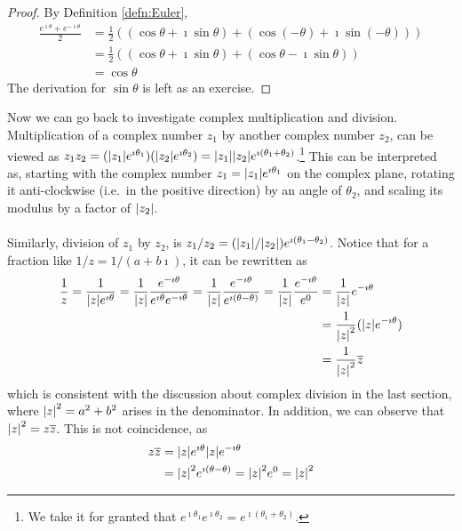 \begin{proof}
By Definition \ref{defn:Euler},
\begin{align*}
\frac{e^{\imath\theta} + e^{-\imath\theta}}{2} &= \frac{1}{2}((\cos \theta + \imath \sin \theta) + (\cos (-\theta) + \imath \sin (-\theta))) \\
&= \frac{1}{2}((\cos \theta + \imath \sin \theta) + (\cos \theta - \imath \sin \theta)) \\
&= \cos \theta
\end{align*}  
The derivation for $\sin \theta$ is left as an exercise.
\end{proof}
Now we can go back to investigate complex multiplication and division. Multiplication of a complex number $z_1$ by another complex number $z_2$, can be viewed as $z_1z_2 = (\abs{z_1}e^{\imath \theta_1}) (\abs{z_2} e^{\imath \theta_2}) = \abs{z_1}\abs{z_2}e^{\imath (\theta_1+\theta_2)}$.\footnote{We take it for granted that $e^{\imath \theta_1}e^{\imath \theta_2} = e^{\imath (\theta_1+\theta_2)}$.} This can be interpreted as, starting with the complex number $z_1 = \abs{z_1}e^{\imath \theta_1}$ on the complex plane, rotating it anti-clockwise (i.e.\ in the positive direction) by an angle of $\theta_2$, and scaling its modulus by a factor of $\abs{z_2}$. \\
\\
Similarly, division of $z_1$ by $z_2$, is $z_1/z_2 = (\abs{z_1}/\abs{z_2})e^{\imath (\theta_1-\theta_2)}$. Notice that for a fraction like $1/z = 1/(a+b\imath)$, it can be rewritten as
\begin{align*}
\frac{1}{z} = \frac{1}{\abs{z}e^{\imath \theta}} = \frac{1}{\abs{z}}\frac{e^{-\imath \theta}}{e^{\imath \theta}e^{-\imath \theta}} = \frac{1}{\abs{z}}\frac{e^{-\imath \theta}}{e^{\imath (\theta-\theta)}} = \frac{1}{\abs{z}}\frac{e^{-\imath \theta}}{e^0} &= \frac{1}{\abs{z}} e^{-\imath \theta} \\
&= \frac{1}{\abs{z}^2} (\abs{z} e^{-\imath \theta}) \\
&= \frac{1}{\abs{z}^2} \overline{z}
\end{align*}
which is consistent with the discussion about complex division in the last section, where $\abs{z}^2 = a^2 + b^2$ arises in the denominator. In addition, we can observe that $\abs{z}^2 = z\overline{z}$. This is not coincidence, as
\begin{align}
z\overline{z} &= \abs{z} e^{\imath \theta} \abs{z} e^{-\imath \theta} \nonumber \\
&= \abs{z}^2 e^{\imath(\theta-\theta)} = \abs{z}^2e^{0} = \abs{z}^2 \label{eqn:zzbar}
\end{align}
